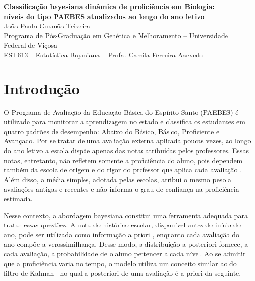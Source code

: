 \documentclass[11pt,a4paper]{article}
\begin{document}
\begin{center}
  {\large\bfseries Classificação bayesiana dinâmica de proficiência em Biologia:\\
  níveis do tipo PAEBES atualizados ao longo do ano letivo}\\[0.8em]
  João Paulo Gusmão Teixeira\\
  {\small Programa de Pós-Graduação em Genética e Melhoramento -- Universidade Federal de Viçosa\\
  EST613 -- Estatística Bayesiana -- Profa. Camila Ferreira Azevedo}
\end{center}

\section{Introdução}

O Programa de Avaliação da Educação Básica do Espírito Santo (PAEBES) é utilizado para
monitorar a aprendizagem no estado e classifica os estudantes em quatro padrões de desempenho:
Abaixo do Básico, Básico, Proficiente e Avançado. Por se tratar de uma avaliação externa
aplicada poucas vezes, ao longo do ano letivo a escola dispõe apenas das notas atribuídas pelos
professores. Essas notas, entretanto, não refletem somente a proficiência do aluno, pois
dependem também da escola de origem e do rigor do professor que aplica cada avaliação
\citep{zitzmann2025}. Além disso, a média simples, adotada pelas escolas, atribui o mesmo peso
a avaliações antigas e recentes e não informa o grau de confiança na proficiência estimada.

Nesse contexto, a abordagem bayesiana constitui uma ferramenta adequada para tratar essas
questões. A nota do histórico escolar, disponível antes do início do ano, pode ser utilizada
como informação a priori \citep{vanmoere2020}, enquanto cada avaliação do ano compõe a
verossimilhança. Desse modo, a distribuição a posteriori fornece, a cada avaliação, a
probabilidade de o aluno pertencer a cada nível. Ao se admitir que a proficiência varia no
tempo, o modelo utiliza um conceito similar ao do filtro de Kalman \citep{kalman1960}, no qual
a posteriori de uma avaliação é a priori da seguinte.
\end{document}
